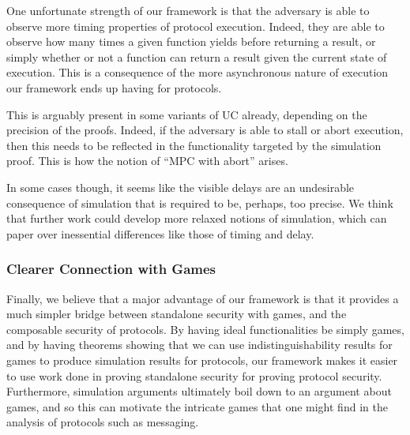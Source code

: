 One unfortunate strength of our framework is that the adversary
is able to observe more timing properties of protocol execution.
Indeed, they are able to observe how many times a given function
yields before returning a result, or simply whether
or not a function can return a result given the current state of
execution.
This is a consequence of the more asynchronous nature
of execution our framework ends up having for protocols.

This is arguably present in some variants of UC already,
depending on the precision of the proofs.
Indeed, if the adversary is able to stall or abort execution,
then this needs to be reflected in the functionality
targeted by the simulation proof.
This is how the notion of ``MPC with abort'' arises.

In some cases though, it seems like the visible
delays are an undesirable consequence of simulation that
is required to be, perhaps, too precise.
We think that further work could develop more relaxed notions of simulation,
which can paper over inessential differences like those of timing and delay.

\subsubsection*{Clearer Connection with Games}

Finally, we believe that a major advantage of our framework is that
it provides a much simpler bridge between standalone security
with games, and the composable security of protocols.
By having ideal functionalities be simply games,
and by having theorems showing that
we can use indistinguishability results for games to produce
simulation results for protocols,
our framework makes it easier to use work done in proving
standalone security for proving protocol security.
Furthermore, simulation arguments ultimately boil down
to an argument about games, and so this can motivate the
intricate games that one might find in the analysis of protocols
such as messaging.
